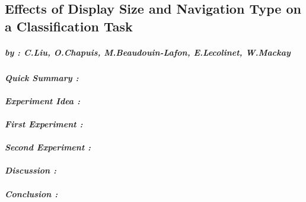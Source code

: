 \subsection{Effects of Display Size and Navigation Type on a Classification Task}
    \subparagraph{by : C.Liu, O.Chapuis, M.Beaudouin-Lafon, E.Lecolinet, W.Mackay}
    \cite{liu2014effects}
    \paragraph{ \textit{Quick Summary :} 
                \newline
                \indent \indent \textnormal{} }
    
    \paragraph{ \textit{Experiment Idea :} 
                \newline
                \indent \indent \textnormal{} }

    \paragraph{ \textit{First Experiment :} 
                \newline
                \indent \indent \textnormal{} }

    \paragraph{ \textit{Second Experiment :} 
                \newline
                \indent \indent \textnormal{} }

    \paragraph{ \textit{Discussion :}
                \newline
                \indent \indent \textnormal{} }
                
    \paragraph{ \textit{Conclusion :}
                \newline
                \indent \indent \textnormal{} }